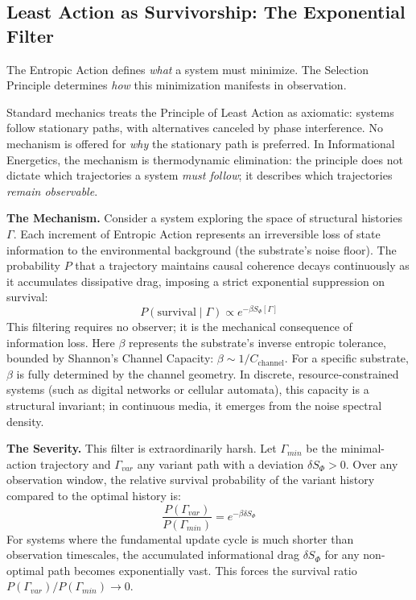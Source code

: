\subsection{Least Action as Survivorship: The Exponential Filter}
\label{sec:least_action}

The Entropic Action defines \textit{what} a system must minimize. The Selection Principle determines \textit{how} this minimization manifests in observation.

Standard mechanics treats the Principle of Least Action as axiomatic: systems follow stationary paths, with alternatives canceled by phase interference. No mechanism is offered for \textit{why} the stationary path is preferred. In Informational Energetics, the mechanism is thermodynamic elimination: the principle does not dictate which trajectories a system \textit{must follow}; it describes which trajectories \textit{remain observable}.

\textbf{The Mechanism.} Consider a system exploring the space of structural histories $\Gamma$. Each increment of Entropic Action represents an irreversible loss of state information to the environmental background (the substrate's noise floor). The probability $P$ that a trajectory maintains causal coherence decays continuously as it accumulates dissipative drag, imposing a strict exponential suppression on survival:
\begin{equation}
    P(\text{survival} \mid \Gamma) \propto e^{-\beta S_\Phi[\Gamma]}
    \label{eq:survival_prob}
\end{equation}
This filtering requires no observer; it is the mechanical consequence of information loss. Here $\beta$ represents the substrate's inverse entropic tolerance, bounded by Shannon's Channel Capacity: $\beta \sim 1/C_{\text{channel}}$. For a specific substrate, $\beta$ is fully determined by the channel geometry. In discrete, resource-constrained systems (such as digital networks or cellular automata), this capacity is a structural invariant; in continuous media, it emerges from the noise spectral density.

\textbf{The Severity.} This filter is extraordinarily harsh. Let $\Gamma_{min}$ be the minimal-action trajectory and $\Gamma_{var}$ any variant path with a deviation $\delta S_\Phi > 0$. Over any observation window, the relative survival probability of the variant history compared to the optimal history is:
\begin{equation}
    \frac{P(\Gamma_{var})}{P(\Gamma_{min})} = e^{-\beta \delta S_\Phi}
\end{equation}
For systems where the fundamental update cycle is much shorter than observation timescales, the accumulated informational drag $\delta S_\Phi$ for any non-optimal path becomes exponentially vast. This forces the survival ratio $P(\Gamma_{var})/P(\Gamma_{min}) \to 0$.

